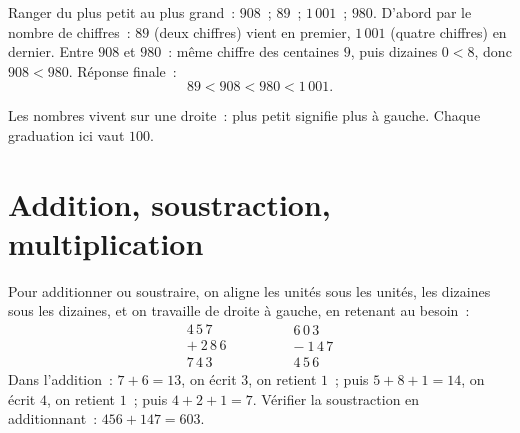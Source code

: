 \begin{example}\label{ex:g6:wholes:order}
Ranger du plus petit au plus grand~: $908$~; $89$~; $1\,001$~; $980$.
D'abord par le nombre de chiffres~: $89$ (deux chiffres) vient en
premier, $1\,001$ (quatre chiffres) en dernier. Entre $908$ et
$980$~: même chiffre des centaines $9$, puis dizaines $0 < 8$, donc
$908 < 980$. Réponse finale~:
\[
89 < 908 < 980 < 1\,001 .
\]
\end{example}

\begin{omfigure}

{\small Les nombres vivent sur une droite~: plus petit signifie plus
à gauche. Chaque graduation ici vaut $100$.}
\end{omfigure}

\section{Addition, soustraction, multiplication}

\begin{example}\label{ex:g6:wholes:columns}
Pour additionner ou soustraire, on aligne les unités sous les unités,
les dizaines sous les dizaines, et on travaille de droite à gauche, en
retenant au besoin~:
\[
\begin{array}{r}
4\,5\,7 \\
+\ 2\,8\,6 \\
\hline
7\,4\,3
\end{array}
\qquad\qquad
\begin{array}{r}
6\,0\,3 \\
-\ 1\,4\,7 \\
\hline
4\,5\,6
\end{array}
\]
Dans l'addition~: $7 + 6 = 13$, on écrit $3$, on retient $1$~; puis
$5 + 8 + 1 = 14$, on écrit $4$, on retient $1$~; puis $4 + 2 + 1 = 7$.
Vérifier la soustraction en additionnant~: $456 + 147 = 603$.
\end{example}

